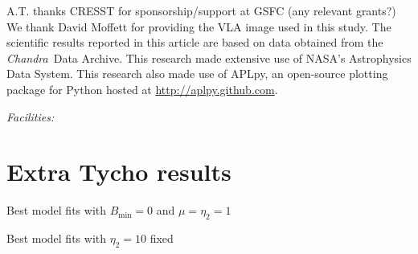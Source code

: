 \documentclass[iop, apj, numberedappendix]{emulateapj}
\newcommand*{\mt}{\mathrm}
\newcommand*{\Chandra}{\textit{Chandra}\ }
\newcommand*{\Bmin}{B_{\mt{min}}}
\begin{document}
%

\acknowledgments

A.T. thanks CRESST for sponsorship/support at GSFC (any relevant grants?)
We thank David Moffett for providing the VLA image used in this study.
The scientific results reported in this article are based on data obtained from
the \Chandra Data Archive.
This research made extensive use of NASA's Astrophysics Data System.
This research also made use of APLpy, an open-source plotting package for
Python hosted at \href{http://aplpy.github.com}{http://aplpy.github.com}.

{\it Facilities:} 



\clearpage
\appendix

\setcounter{table}{0}
\renewcommand{\thetable}{A\arabic{table}}
\setcounter{figure}{0}
\renewcommand{\thefigure}{A\arabic{figure}}

\section{Extra Tycho results}

\begin{table}
    \scriptsize
    \centering
    \caption{Best model fits with $\Bmin = 0$ and $\mu = \eta_2 = 1$}
    
\end{table}

\begin{table}
    \scriptsize
    \centering
    \caption{Best model fits with $\eta_2 = 10$ fixed}
    
\end{table}
\end{document}
